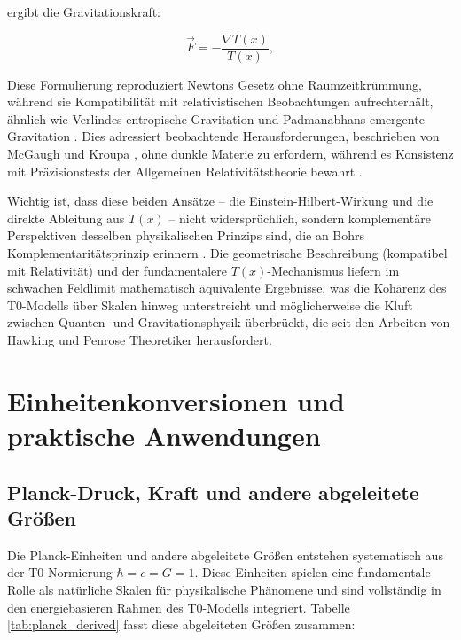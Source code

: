 \documentclass[twocolumn,aps,prl]{revtex4-2}
\begin{document}
{{{{{{{{{{{{{{{																	ergibt die Gravitationskraft:
																	
																	\begin{equation}
																		\vec{F} = -\frac{\nabla T(x)}{T(x)}, \label{eq:grav_force}
																	\end{equation}
																	
																	Diese Formulierung reproduziert Newtons Gesetz ohne Raumzeitkrümmung, während sie Kompatibilität mit relativistischen Beobachtungen aufrechterhält, ähnlich wie Verlindes entropische Gravitation \cite{Verlinde2011} und Padmanabhans emergente Gravitation \cite{Padmanabhan2012}. Dies adressiert beobachtende Herausforderungen, beschrieben von McGaugh \cite{McGaugh2011} und Kroupa \cite{Kroupa2012}, ohne dunkle Materie zu erfordern, während es Konsistenz mit Präzisionstests der Allgemeinen Relativitätstheorie bewahrt \cite{Will2014}.
																	
																	Wichtig ist, dass diese beiden Ansätze – die Einstein-Hilbert-Wirkung und die direkte Ableitung aus \(T(x)\) – nicht widersprüchlich, sondern komplementäre Perspektiven desselben physikalischen Prinzips sind, die an Bohrs Komplementaritätsprinzip erinnern \cite{Bohr1928}. Die geometrische Beschreibung (kompatibel mit Relativität) und der fundamentalere \(T(x)\)-Mechanismus liefern im schwachen Feldlimit mathematisch äquivalente Ergebnisse, was die Kohärenz des T0-Modells über Skalen hinweg unterstreicht und möglicherweise die Kluft zwischen Quanten- und Gravitationsphysik überbrückt, die seit den Arbeiten von Hawking \cite{Hawking1975} und Penrose \cite{Penrose1965} Theoretiker herausfordert.
																	
																	\section{Einheitenkonversionen und praktische Anwendungen}
																	\label{sec:conversions}
																	
																	\subsection{Planck-Druck, Kraft und andere abgeleitete Größen}
																	\label{subsec:planck_derived}
																	
																	Die Planck-Einheiten und andere abgeleitete Größen entstehen systematisch aus der T0-Normierung \(\hbar = c = G = 1\). Diese Einheiten spielen eine fundamentale Rolle als natürliche Skalen für physikalische Phänomene und sind vollständig in den energiebasieren Rahmen des T0-Modells integriert. Tabelle \ref{tab:planck_derived} fasst diese abgeleiteten Größen zusammen:
																	
}}}}}}}}}}}}}}}
\end{document}
